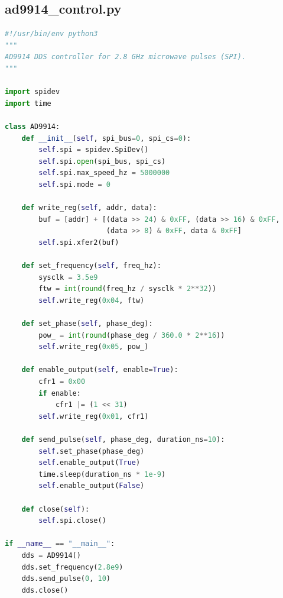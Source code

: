 \documentclass[12pt,a4paper]{article}
\begin{document}
\subsection*{ad9914\_control.py}
\begin{lstlisting}[language=Python]
#!/usr/bin/env python3
"""
AD9914 DDS controller for 2.8 GHz microwave pulses (SPI).
"""

import spidev
import time

class AD9914:
    def __init__(self, spi_bus=0, spi_cs=0):
        self.spi = spidev.SpiDev()
        self.spi.open(spi_bus, spi_cs)
        self.spi.max_speed_hz = 5000000
        self.spi.mode = 0

    def write_reg(self, addr, data):
        buf = [addr] + [(data >> 24) & 0xFF, (data >> 16) & 0xFF,
                        (data >> 8) & 0xFF, data & 0xFF]
        self.spi.xfer2(buf)

    def set_frequency(self, freq_hz):
        sysclk = 3.5e9
        ftw = int(round(freq_hz / sysclk * 2**32))
        self.write_reg(0x04, ftw)

    def set_phase(self, phase_deg):
        pow_ = int(round(phase_deg / 360.0 * 2**16))
        self.write_reg(0x05, pow_)

    def enable_output(self, enable=True):
        cfr1 = 0x00
        if enable:
            cfr1 |= (1 << 31)
        self.write_reg(0x01, cfr1)

    def send_pulse(self, phase_deg, duration_ns=10):
        self.set_phase(phase_deg)
        self.enable_output(True)
        time.sleep(duration_ns * 1e-9)
        self.enable_output(False)

    def close(self):
        self.spi.close()

if __name__ == "__main__":
    dds = AD9914()
    dds.set_frequency(2.8e9)
    dds.send_pulse(0, 10)
    dds.close()
\end{lstlisting}
\end{document}
